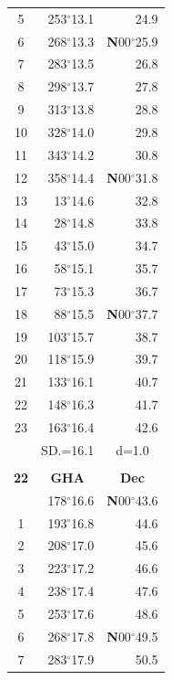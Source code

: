 \documentclass[10pt, a4paper]{report}
\begin{document}
\begin{scriptsize}
\begin{tabular*}{0.2\textwidth}[t]{@{\extracolsep{\fill}}|c|rr|}
5 & 253$^\circ$13.1 & 24.9\\[2Pt]
6 & 268$^\circ$13.3 & \textbf{N}00$^\circ$25.9\\
7 & 283$^\circ$13.5 & 26.8\\
8 & 298$^\circ$13.7 & 27.8\\
9 & 313$^\circ$13.8 & \raisebox{0.24ex}{\boldmath$\cdot$~\boldmath$\cdot$~~}28.8\\
10 & 328$^\circ$14.0 & 29.8\\
11 & 343$^\circ$14.2 & 30.8\\[2Pt]
12 & 358$^\circ$14.4 & \textbf{N}00$^\circ$31.8\\
13 & 13$^\circ$14.6 & 32.8\\
14 & 28$^\circ$14.8 & 33.8\\
15 & 43$^\circ$15.0 & \raisebox{0.24ex}{\boldmath$\cdot$~\boldmath$\cdot$~~}34.7\\
16 & 58$^\circ$15.1 & 35.7\\
17 & 73$^\circ$15.3 & 36.7\\[2Pt]
18 & 88$^\circ$15.5 & \textbf{N}00$^\circ$37.7\\
19 & 103$^\circ$15.7 & 38.7\\
20 & 118$^\circ$15.9 & 39.7\\
21 & 133$^\circ$16.1 & \raisebox{0.24ex}{\boldmath$\cdot$~\boldmath$\cdot$~~}40.7\\
22 & 148$^\circ$16.3 & 41.7\\
23 & 163$^\circ$16.4 & 42.6\\
\hline
\rule{0pt}{2.4ex} & \multicolumn{1}{c}{SD.=16.1} & \multicolumn{1}{c|}{d=1.0}\\
\hline
\multicolumn{1}{c}{}\\[-0.5ex]\hline
\multicolumn{1}{|c|}{\rule{0pt}{2.6ex}\textbf{22}} & \multicolumn{1}{c}{\textbf{GHA}} & \multicolumn{1}{c|}{\textbf{Dec}}\\
\hline\rule{0pt}{2.6ex}\noindent
0 & 178$^\circ$16.6 & \textbf{N}00$^\circ$43.6\\
1 & 193$^\circ$16.8 & 44.6\\
2 & 208$^\circ$17.0 & 45.6\\
3 & 223$^\circ$17.2 & \raisebox{0.24ex}{\boldmath$\cdot$~\boldmath$\cdot$~~}46.6\\
4 & 238$^\circ$17.4 & 47.6\\
5 & 253$^\circ$17.6 & 48.6\\[2Pt]
6 & 268$^\circ$17.8 & \textbf{N}00$^\circ$49.5\\
7 & 283$^\circ$17.9 & 50.5\\

\end{tabular*}
\end{scriptsize}
\end{document}
